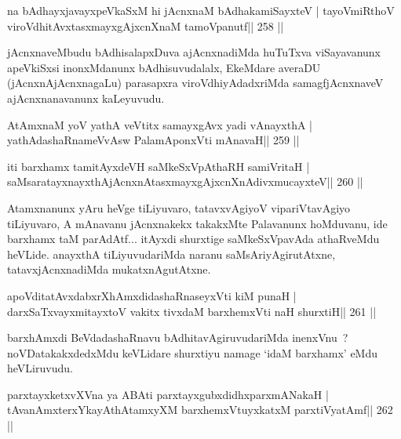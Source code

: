 \begin{shl}
na bAdhayxjavayxpeVkaSxM hi jAcnxnaM bAdhakamiSayxteV |
tayoVmiRthoV viroVdhitAvxtasxmayxgAjxcnXnaM tamoVpanutf\hfill || 258 ||
\end{shl}


\begin{artha}
jAcnxnaveMbudu bAdhisalapxDuva ajAcnxnadiMda huTuTxva viSayavanunx apeVkiSxsi inonxMdanunx bAdhisuvudalalx, EkeMdare averaDU (jAcnxnAjAcnxnagaLu) parasapxra viroVdhiyAdadxriMda samagfjAcnxnaveV ajAcnxnanavanunx kaLeyuvudu.
\end{artha}

\begin{shl}
AtAmxnaM yoV yathA veVtitx samayxgAvx yadi vA\s nayxthA |
yathAdashaRnameVvAsw PalamAponxVti mAnavaH\hfill || 259 ||
\end{shl}

\begin{shl}
iti barxhamx tamitAyxdeVH saMkeSxVpAthaRH samiVritaH |
saMsaratayxnayxthAjAcnxnAtasxmayxgAjxcnXnAdivxmucayxteV\hfill || 260 ||
\end{shl}

\begin{artha}
Atamxnanunx yAru heVge tiLiyuvaro, tatavxvAgiyoV vipariVtavAgiyo tiLiyuvaro, A mAnavanu jAcnxnakekx takakxMte Palavanunx hoMduvanu, ide barxhamx taM parAdAtf... itAyxdi shurxtige saMkeSxVpavAda athaRveMdu heVLide. anayxthA tiLiyuvudariMda naranu saMsAriyAgirutAtxne, tatavxjAcnxnadiMda mukatxnAgutAtxne.
\end{artha}

\begin{shl}
apoVditatAvxdabxrXhAmxdidashaRnaseyxVti kiM punaH |
darxSaTxvayxmitayxtoV vakitx tivxdaM barxhemxVti naH shurxtiH\hfill || 261 ||
\end{shl}

\begin{artha}
barxhAmxdi BeVdadashaRnavu bAdhitavAgiruvudariMda inenxVnu~? noVDatakakxdedxMdu keVLidare shurxtiyu namage \footnotemark[1]`idaM barxhamx' eMdu heVLiruvudu.
\end{artha}

\begin{shl}
parxtayxketxvXVna ya ABAti parxtayxgubxdidhxparxmANakaH |
tAvanAmxterxYkayAthAtamxyXM barxhemxVtuyxkatxM parxtiVyatAmf\hfill || 262 ||
\end{shl}

